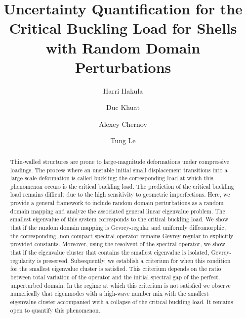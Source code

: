 \documentclass[11pt,a4paper]{article}
\title{Uncertainty Quantification for the Critical Buckling Load for Shells with Random Domain Perturbations}
\author{Harri Hakula\footnotemark[2]\and Duc Khuat\footnotemark[2]\and Alexey Chernov\footnotemark[1]\and Tung Le\footnotemark[1] }
\begin{document}
\maketitle

\begin{abstract} 

    Thin-walled structures are prone to large-magnitude deformations under compressive loadings. 
    The process where an unstable initial small displacement transitions into a large-scale 
    deformation is called buckling; the corresponding load at which this phenomenon occurs is the critical buckling load.
    The prediction of the critical buckling load remains difficult due to the high 
    sensitivity to geometric imperfections. 
    Here, we provide a general framework to include random domain perturbations as a 
    random domain mapping and analyze the associated 
    general linear eigenvalue problem. The smallest eigenvalue of this system corresponds to the critical buckling load.
    We show that if the random domain mapping is Gevrey-regular and uniformly diffeomorphic, the
    corresponding, non-compact spectral operator remains Gevrey-regular to explicitly provided constants.
    Moreover, using the resolvent of the spectral operator, we show that if the eigenvalue cluster that 
    contains the smallest eigenvalue is isolated, Gevrey-regularity is preserved. Subsequently, 
    we establish a criterium for when this condition for the smallest eigenvalue cluster 
    is satisfied.
    This criterium depends on the ratio between total variation of the operator and 
    the initial spectral gap of the perfect, unperturbed domain.
    In the regime at which this criterium is not satisfied we observe numerically that
    eigenmodes with a high-wave number mix with the smallest eigenvalue cluster
    accompanied with a collapse of the critical buckling load. 
    It remains open to quantify this phenomenon.


\end{abstract}
%
\end{document}

